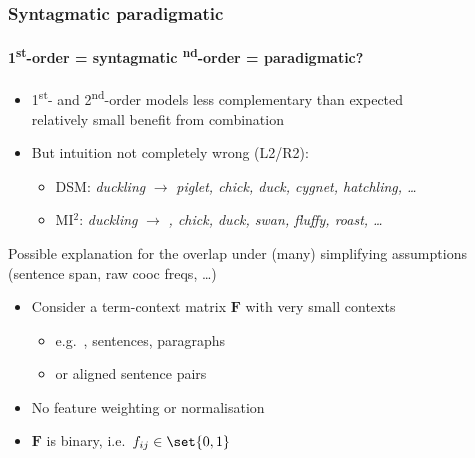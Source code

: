 \documentclass[t]{beamer} %
\newcommand{\First}{1\textsuperscript{st}\xspace}
\newcommand{\Second}{2\textsuperscript{nd}\xspace}
\begin{document}
\begin{frame}
 \frametitle{Syntagmatic \vs paradigmatic}
  \framesubtitle{\First-order = syntagmatic \vs \Second-order = paradigmatic?}
 
 \begin{itemize}
 \item \First- and \Second-order models less complementary than expected\\
   \So relatively small benefit from combination
 \item But intuition not completely wrong (L2/R2):
   \begin{itemize}
   \item DSM: \emph{duckling} $\to$ \emph{piglet, chick, duck, cygnet, hatchling, \ldots}
   \item MI$^2$: \emph{duckling} $\to$ \emph{, chick, duck, swan, fluffy, roast, \ldots}
   \end{itemize}
 \end{itemize}

 \gap[1]
 Possible explanation for the overlap under (many) simplifying assumptions (sentence span, raw cooc freqs, \ldots)
 \begin{itemize}
 \item Consider a term-context matrix $\mathbf{F}$ with very small contexts
   \begin{itemize}
   \item e.g.\ , sentences, paragraphs
   \item or aligned sentence pairs \citep{Sahlgren:Karlgren:05}
   \end{itemize}
 \item No feature weighting or normalisation
 \item[\So] $\mathbf{F}$ is binary, i.e.\ $f_{ij} \in \set{0, 1}$
 \end{itemize}
\end{frame}
\end{document}
